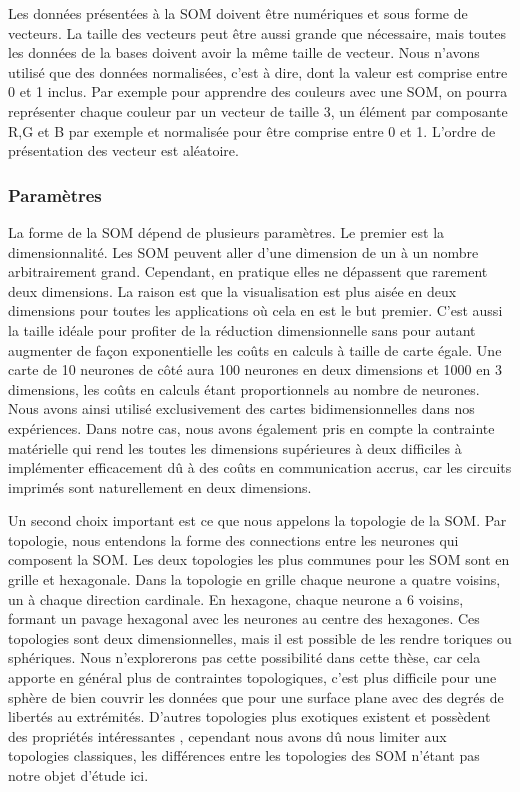 	Les données présentées à la SOM doivent être numériques et sous forme de vecteurs. La taille des vecteurs peut être aussi grande que nécessaire, mais toutes les données de la bases doivent avoir la même taille de vecteur. Nous n'avons utilisé que des données normalisées, c'est à dire, dont la valeur est comprise entre 0 et 1 inclus. Par exemple pour apprendre des couleurs avec une SOM, on pourra représenter chaque couleur par un vecteur de taille 3, un élément par composante R,G et B par exemple et normalisée pour être comprise entre 0 et 1. L'ordre de présentation des vecteur est aléatoire.

\subsubsection{Paramètres}\label{param_som}

	La forme de la SOM dépend de plusieurs paramètres. Le premier est la dimensionnalité. Les SOM peuvent aller d'une dimension de un à un nombre arbitrairement grand. Cependant, en pratique elles ne dépassent que rarement deux dimensions. La raison est que la visualisation est plus aisée en deux dimensions pour toutes les applications où cela en est le but premier. C'est aussi la taille idéale pour profiter de la réduction dimensionnelle sans pour autant augmenter de façon exponentielle les coûts en calculs à taille de carte égale. Une carte de 10 neurones de côté aura 100 neurones en deux dimensions et 1000 en 3 dimensions, les coûts en calculs étant proportionnels au nombre de neurones. Nous avons ainsi utilisé exclusivement des cartes bidimensionnelles dans nos expériences. Dans notre cas, nous avons également pris en compte la contrainte matérielle qui rend les toutes les dimensions supérieures à deux difficiles à implémenter efficacement dû à des coûts en communication accrus, car les circuits imprimés sont naturellement en deux dimensions.
	
	Un second choix important est ce que nous appelons la topologie de la SOM. Par topologie, nous entendons la forme des connections entre les neurones qui composent la SOM. Les deux topologies les plus communes pour les SOM sont en grille et hexagonale. Dans la topologie en grille chaque neurone a quatre voisins, un à chaque direction cardinale. En hexagone, chaque neurone a 6 voisins, formant un pavage hexagonal avec les neurones au centre des hexagones. Ces topologies sont deux dimensionnelles, mais il est possible de les rendre toriques ou sphériques. Nous n'explorerons pas cette possibilité dans cette thèse, car cela apporte en général plus de contraintes topologiques, c'est plus difficile pour une sphère de bien couvrir les données que pour une surface plane avec des degrés de libertés au extrémités. D'autres topologies plus exotiques existent et possèdent des propriétés intéressantes \cite{bernard2018np}, cependant nous avons dû nous limiter aux topologies classiques, les différences entre les topologies des SOM n'étant pas notre objet d'étude ici.

